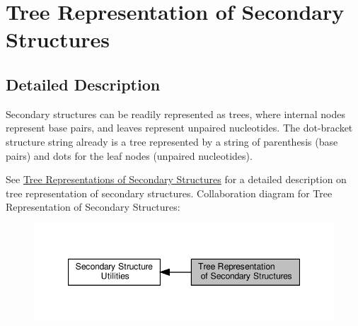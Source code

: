 \hypertarget{group__struct__utils__tree}{}\section{Tree Representation of Secondary Structures}
\label{group__struct__utils__tree}


\subsection{Detailed Description}
Secondary structures can be readily represented as trees, where internal nodes represent base pairs, and leaves represent unpaired nucleotides. The dot-\/bracket structure string already is a tree represented by a string of parenthesis (base pairs) and dots for the leaf nodes (unpaired nucleotides).

See \hyperlink{rna_structure_notations_sec_structure_representations_tree}{Tree Representations of Secondary Structures} for a detailed description on tree representation of secondary structures. Collaboration diagram for Tree Representation of Secondary Structures\+:
\nopagebreak
\begin{figure}[H]
\begin{center}
\leavevmode
\includegraphics[width=347pt]{group__struct__utils__tree}
\end{center}
\end{figure}
